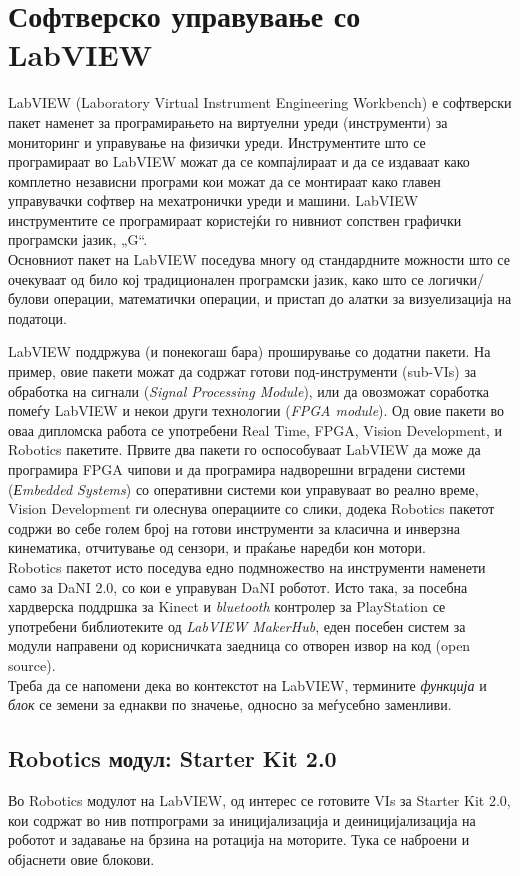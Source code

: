 \documentclass[11pt]{article}
\begin{document}
\newpage

\section{Софтверско управување со LabVIEW}
  LabVIEW (Laboratory Virtual Instrument Engineering Workbench) е софтверски пакет наменет за програмирањето на виртуелни уреди (инструменти) за мониторинг и управување на физички уреди. Инструментите што се програмираат во LabVIEW можат да се компајлираат и да се издаваат како комплетно независни програми кои можат да се монтираат како главен управувачки софтвер на мехатронички уреди и машини. LabVIEW инструментите се програмираат користејќи го нивниот сопствен графички програмски јазик, „G“.
  \\
  Основниот пакет на LabVIEW поседува многу од стандардните можности што се очекуваат од било кој традиционален програмски јазик, како што се логички/булови операции, математички операции, и пристап до алатки за визуелизација на податоци.

  LabVIEW поддржува (и понекогаш бара) проширување со додатни пакети. На пример, овие пакети можат да содржат готови под-инструменти (sub-VIs) за обработка на сигнали (\textit{Signal Processing Module}), или да овозможат соработка помеѓу LabVIEW и некои други технологии (\textit{FPGA module}). Од овие пакети во оваа дипломска работа се употребени Real Time, FPGA, Vision Development, и Robotics пакетите. Првите два пакети го оспособуваат LabVIEW да може да програмира FPGA чипови и да програмира надворешни вградени системи (\textit{Еmbedded Systems}) со оперативни системи кои управуваат во реално време, Vision Development ги олеснува операциите со слики, додека Robotics пакетот содржи во себе голем број на готови инструменти за класична и инверзна кинематика, отчитување од сензори, и праќање наредби кон мотори.
  \\
  Robotics пакетот исто поседува едно подмножество на инструменти наменети само за DaNI 2.0, со кои е управуван DaNI роботот. Исто така, за посебна хардверска поддршка за Kinect и \textit{bluetooth} контролер за PlayStation се употребени библиотеките од \textit{LabVIEW MakerHub}, еден посебен систем за модули направени од корисничката заедница со отворен извор на код (open source).
  \\
  Треба да се напомени дека во контекстот на LabVIEW, термините \textit{функција} и \textit{блок} се земени за еднакви по значење, односно за меѓусебно заменливи.

  \subsection{Robotics модул: Starter Kit 2.0}
    Во Robotics модулот на LabVIEW, од интерес се готовите VIs за Starter Kit 2.0, кои содржат во нив потпрограми за иницијализација и деиницијализација на роботот и задавање на брзина на ротација на моторите. Тука се наброени и објаснети овие блокови.
\end{document}

